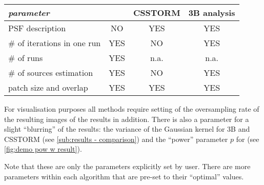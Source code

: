 \begin{table}[!h]
\centering
	\begin{tabular}{|l||c|c|c|}
		\hline
		{\it parameter}				& {\bf\inmf} & {\bf CSSTORM} & {\bf 3B analysis}\\ \hline
		
		PSF description		& NO  	& YES	& YES \\ \hline
		\# of iterations in one run	& YES	& NO 	& YES \\ \hline
		\# of runs				& YES	& n.a. 	& n.a.   \\ \hline	
		\# of sources estimation	& YES	& NO	& YES \\ \hline
		patch size and overlap	& YES 	& YES	& YES \\ \hline
	\end{tabular}
\end{table}

For visualisation purposes all methods require setting of the oversampling rate of the resulting images of the results in addition. There is also a parameter for a slight ``blurring'' of the results: the variance of the Gaussian kernel for 3B and CSSTORM  (see \autoref{sub:results - comparison}) and the ``power'' parameter $p$ for \inmf{} (see \autoref{fig:demo pow w result}).

Note that these are only the parameters explicitly set by user. There are more parameters within each algorithm that are pre-set to their ``optimal'' values. 
\afterpage{\clearpage}


